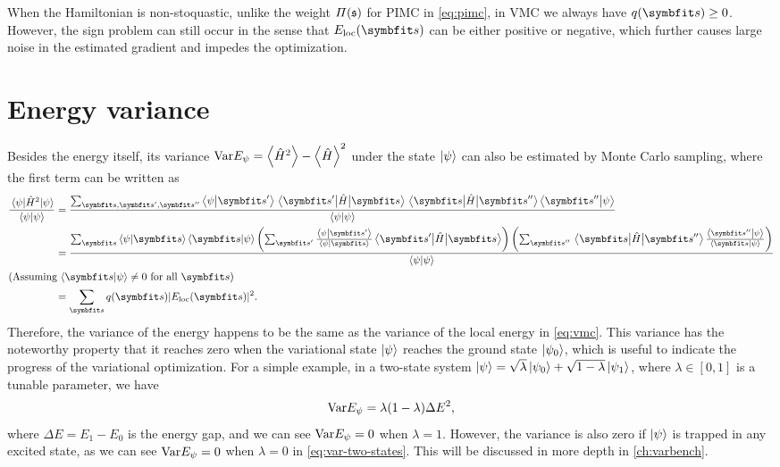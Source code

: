 When the Hamiltonian is non-stoquastic, unlike the weight $\varPi(\mathfrak{s})$ for PIMC in \cref{eq:pimc}, in VMC we always have $q(\vs) \ge 0$. However, the sign problem can still occur in the sense that $E_\text{loc}(\vs)$ can be either positive or negative, which further causes large noise in the estimated gradient and impedes the optimization.

\section{Energy variance}
\label{sec:vmc-var}

Besides the energy itself, its variance $\Var E_\psi = \ev{\hat{H}^2} - \ev{\hat{H}}^2$ under the state $\ket{\psi}$ can also be estimated by Monte Carlo sampling, where the first term can be written as
\begin{align}
\frac{\ev{\hat{H}^2}{\psi}}{\ip{\psi}}
&= \frac
{\sum_{\vs, \vs', \vs''} \ip{\psi}{\vs'} \mel{\vs'}{\hat{H}}{\vs} \mel{\vs}{\hat{H}}{\vs''} \ip{\vs''}{\psi}}
{\ip{\psi}} \label{eq:vmc-var-1} \\
&= \frac
{\sum_\vs \ip{\psi}{\vs} \ip{\vs}{\psi}
\left( \sum_{\vs'} \frac{\ip{\psi}{\vs'}}{\ip{\psi}{\vs}} \mel{\vs'}{\hat{H}}{\vs} \right)
\left( \sum_{\vs''} \mel{\vs}{\hat{H}}{\vs''} \frac{\ip{\vs''}{\psi}}{\ip{\vs}{\psi}} \right)}
{\ip{\psi}} \label{eq:vmc-var-2} \\
\shortintertext{(Assuming $\ip{\vs}{\psi} \neq 0$ for all $\vs$)}
&= \sum_\vs q(\vs) |E_\text{loc}(\vs)|^2. \label{eq:vmc-var}
\end{align}
Therefore, the variance of the energy happens to be the same as the variance of the local energy in \cref{eq:vmc}. This variance has the noteworthy property that it reaches zero when the variational state $\ket{\psi}$ reaches the ground state $\ket{\psi_0}$, which is useful to indicate the progress of the variational optimization. For a simple example, in a two-state system $\ket{\psi} = \sqrt{\lambda} \ket{\psi_0} + \sqrt{1 - \lambda} \ket{\psi_1}$, where $\lambda \in [0, 1]$ is a tunable parameter, we have
\begin{equation}
\mathrm{Var} E_\psi = \lambda (1 - \lambda) \Delta E^2, \label{eq:var-two-states}
\end{equation}
where $\Delta E = E_1 - E_0$ is the energy gap, and we can see $\mathrm{Var} E_\psi = 0$ when $\lambda = 1$. However, the variance is also zero if $\ket{\psi}$ is trapped in any excited state, as we can see $\mathrm{Var} E_\psi = 0$ when $\lambda = 0$ in \cref{eq:var-two-states}. This will be discussed in more depth in \cref{ch:varbench}.

